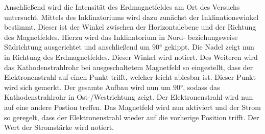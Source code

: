    Anschließend wird die Intensität des Erdmagnetfeldes am Ort des Versuchs untersucht. Mittels des Inklinatoriums wird dazu zunächst der
    Inklinationswinkel bestimmt. Dieser ist der Winkel zwischen der Horizontalebene und der Richtung des Magnetfeldes. Hierzu wird das 
    Inklinatorium in Nord- beziehungsweise Südrichtung ausgerichtet und anschließend um $90°$ gekippt. Die Nadel zeigt nun in Richtung des
    Erdmagnetfeldes. Dieser Winkel wird notiert. Des Weiteren wird das Kathodenstrahlrohr bei ausgeschaltetem Magnetfeld so eingestellt, dass
    der Elektronenstrahl auf einen Punkt trifft, welcher leicht ablesbar ist. Dieser Punkt wird sich gemerkt. Der gesamte Aufbau wird nun um $90°$,
    sodass das Kathodenstrahlrohr in Ost-/Westrichtung zeigt. Der Elektronenstrahl wird nun auf eine andere Postion treffen. 
    Das Magnetfeld wird nun aktiviert und der Strom so geregelt, dass der Elektronenstrahl 
    wieder auf die vorherige Position trifft. Der Wert der Stromstärke wird notiert.